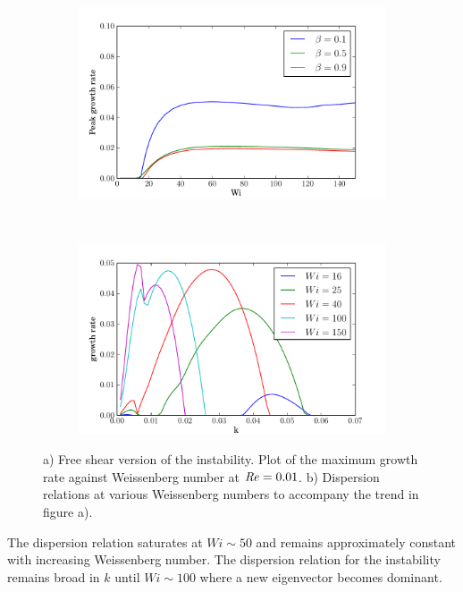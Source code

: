 \documentclass{jfm}
\newcommand\Rey{\mbox{\textit{Re}}}  %
\begin{document}
\begin{figure} 
    \centering 
    \begin{subfigure}[b]{0.48\textwidth} 
	\centering
	\includegraphics[width=\textwidth]{inf_purely_elastic} 
	\caption{}
	\label{fig:inf_low_Re} 
    \end{subfigure} ~
    \begin{subfigure}[b]{0.48\textwidth} 
	\centering
	\includegraphics[width=\textwidth]{inf_dispersions_low_Re} 
	\caption{}
	\label{fig:dispersions_low_Re} 
    \end{subfigure} 
    \caption{
	a) Free shear version of the instability. Plot of the maximum growth
	rate against Weissenberg number at $\Rey = 0.01$. b) Dispersion
	relations at various Weissenberg numbers to accompany the trend in
	figure a).
    } 
\end{figure}

The dispersion relation saturates at $Wi \sim 50$ and remains approximately
constant with increasing Weissenberg number. The dispersion relation for the
instability remains broad in $k$ until $Wi \sim 100$ where a new eigenvector
becomes dominant.
\end{document}

